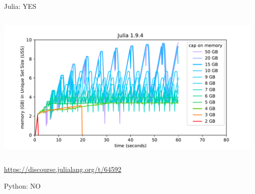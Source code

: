 \documentclass[aspectratio=169]{beamer}
\begin{document}
\begin{frame}{Julia: YES}
\vspace{0.25 cm}
\begin{columns}
\includegraphics[width=\linewidth]{gcbox-julia.pdf}
\end{columns}

\vspace{-7.7 cm}
\hfill\textcolor{blue}{\small\url{https://discourse.julialang.org/t/64592}}\hspace{-1 cm}
\vspace{7.7 cm}
\end{frame}

\begin{frame}{Python: NO}
\vspace{0.25 cm}
\begin{columns}
\end{columns}
\end{frame}
\end{document}
